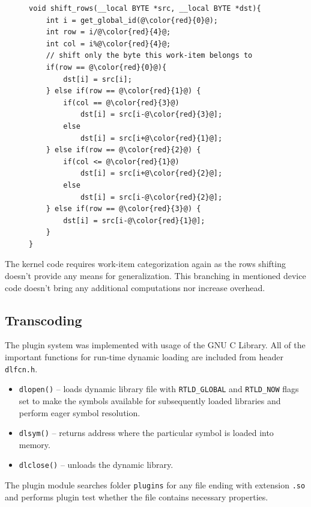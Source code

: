 \begin{figure}[H]
\begin{lstlisting}
void shift_rows(__local BYTE *src, __local BYTE *dst){   
    int i = get_global_id(@\color{red}{0}@);
    int row = i/@\color{red}{4}@;
    int col = i%@\color{red}{4}@;
    // shift only the byte this work-item belongs to
    if(row == @\color{red}{0}@){
        dst[i] = src[i];
    } else if(row == @\color{red}{1}@) {
        if(col == @\color{red}{3}@)
            dst[i] = src[i-@\color{red}{3}@];
        else
            dst[i] = src[i+@\color{red}{1}@];
    } else if(row == @\color{red}{2}@) {
        if(col <= @\color{red}{1}@)
            dst[i] = src[i+@\color{red}{2}@];
        else
            dst[i] = src[i-@\color{red}{2}@];
    } else if(row == @\color{red}{3}@) {
        dst[i] = src[i-@\color{red}{1}@];
    }
}
\end{lstlisting}
\end{figure}

The kernel code requires work-item categorization again as the rows shifting 
doesn't provide any means for generalization. This branching in mentioned device
code doesn't bring any additional computations nor increase overhead.

\subsection{Transcoding}
The plugin system was implemented with usage of the GNU C Library. All of the 
important functions for run-time dynamic loading are included from header
\texttt{dlfcn.h}.

\begin{itemize}
\item \texttt{dlopen()} -- loads dynamic library file with \texttt{RTLD\_GLOBAL}
and \texttt{RTLD\_NOW} flags set to make the symbols available for subsequently 
loaded libraries and perform eager symbol resolution. 
\item \texttt{dlsym()} -- returns address where the particular symbol is loaded
into memory.
\item \texttt{dlclose()} -- unloads the dynamic library.
\end{itemize}

The plugin module searches folder \texttt{plugins} for any file ending with 
extension \texttt{.so} and performs plugin test whether the file contains
necessary properties.

